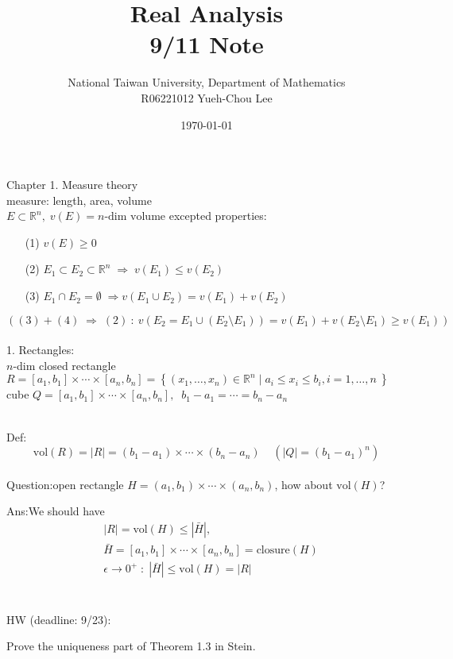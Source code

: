 \documentclass[a4paper,11pt]{article}
\title{Real Analysis\\ 9/11 Note}
\author{National Taiwan University, Department of Mathematics\\
R06221012 \hspace{0.2cm} Yueh-Chou Lee}
\date{\today}
\begin{document}
\maketitle

Chapter 1. Measure theory\\

measure: length, area, volume\\

$E \subset \mathbb{R}^n,\;v(E) = n\text{-dim volume}$ excepted properties:

\begin{enumerate}
	\item[(1)] $v(E) \geq 0$
	\item[(2)] $E_1 \subset E_2 \subset \mathbb{R}^n \;
				\Rightarrow \; v(E_1) \leq v(E_2)$
	\item[(3)] $E_1 \cap E_2 = \emptyset \;
				\Rightarrow v(E_1 \cup E_2) = v(E_1) + v(E_2)$
\end{enumerate}

$\left( (3) + (4) \; \Rightarrow \; (2) \: : \:
v(E_2 = E_1 \cup (E_2 \setminus E_1))
= v(E_1) + v(E_2 \setminus E_1)
\geq v(E_1) \right)$\\\\

1. Rectangles:\\

$n$-dim closed rectangle $R
= [a_1,b_1] \times \cdots \times [a_n,b_n]
= \left\{(x_1,\dots,x_n) \in \mathbb{R}^n \;
| \; a_i \leq x_i \leq b_i, i=1,\dots,n \ \right\}$\\

cube $Q = [a_1,b_1] \times \cdots \times [a_n,b_n],
\;\; b_1 - a_1 = \cdots = b_n - a_n$\\\

Def:
$$\text{vol}(R)
= |R|
= (b_1 - a_1) \times \cdots \times (b_n - a_n) \;\;\;\;
\left(|Q| = (b_1 - a_1)^n \right)$$\\

Question:\;\;open rectangle $H = (a_1,b_1) \times \cdots \times (a_n,b_n)$, how about $\text{vol}(H)$?

Ans:\;\;We should have
$$\begin{aligned}
&|R| = \text{vol}(H) \leq |\bar{H}|,\\
&\bar{H} = [a_1, b_1] \times \cdots \times [a_n,b_n]
= \text{closure}(H)\\
&\epsilon \to 0^+ \;:\; |\bar{H}| \leq \text{vol}(H) = |R|
\end{aligned}$$\\\\


HW (deadline: 9/23):

Prove the uniqueness part of Theorem 1.3 in Stein.



			
\end{document}
